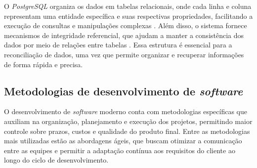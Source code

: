 O \textit{PostgreSQL} organiza os dados em tabelas relacionais, onde cada linha e coluna representam uma entidade específica e suas respectivas propriedades, facilitando a execução de consultas e manipulações complexas \cite{relationaldatabases}. Além disso, o sistema fornece mecanismos de integridade referencial, que ajudam a manter a consistência dos dados por meio de relações entre tabelas \cite{databaseintegrity}. Essa estrutura é essencial para a reconciliação de dados, uma vez que permite organizar e recuperar informações de forma rápida e precisa.

\subsection{Metodologias de desenvolvimento de \textit{software}}

O desenvolvimento de \textit{software} moderno conta com metodologias específicas que auxiliam na organização, planejamento e execução dos projetos, permitindo maior controle sobre prazos, custos e qualidade do produto final. Entre as metodologias mais utilizadas estão as abordagens ágeis, que buscam otimizar a comunicação entre as equipes e permitir a adaptação contínua aos requisitos do cliente ao longo do ciclo de desenvolvimento.

